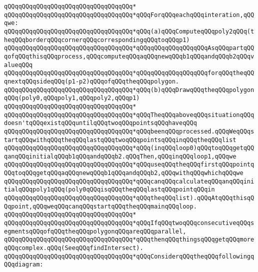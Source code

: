 \verb|qQQqqQQqqQQqqQQqqQQqqQQqqQQqqQQqqQQq*|\newline
\verb|qQQqqQQqqQQqqQQqqQQqqQQqqQQqqQQqqQQq*qQQqForqQQqeachqQQqinteration,qQQqwe:|\newline
\verb|qQQqqQQqqQQqqQQqqQQqqQQqqQQqqQQqqQQq*qQQq(a)qQQqComputeqQQqpoly2qQQq(theqQQqborderqQQqcornerqQQqcorrespondingqQQqtoqQQqp1)|\newline
\verb|qQQqqQQqqQQqqQQqqQQqqQQqqQQqqQQqqQQq*qQQqqQQqqQQqqQQqqQQqAsqQQqpartqQQqofqQQqthisqQQqprocess,qQQqcomputeqQQqaqQQqnewqQQqb1qQQqandqQQqb2qQQqvalueqQQq|\newline
\verb|qQQqqQQqqQQqqQQqqQQqqQQqqQQqqQQqqQQq*qQQqqQQqqQQqqQQqqQQqforqQQqtheqQQqnextqQQqsideqQQq(p1-p2)qQQqofqQQqtheqQQqpolygon.|\newline
\verb|qQQqqQQqqQQqqQQqqQQqqQQqqQQqqQQqqQQq*qQQq(b)qQQqDrawqQQqtheqQQqpolygonqQQq(poly0,qQQqpoly1,qQQqpoly2,qQQqp1)|\newline
\verb|qQQqqQQqqQQqqQQqqQQqqQQqqQQqqQQqqQQq*|\newline
\verb|qQQqqQQqqQQqqQQqqQQqqQQqqQQqqQQqqQQq*qQQqTheqQQqaboveqQQqsituationqQQqdoesn'tqQQqexistqQQquntilqQQqtwoqQQqpointsqQQqhaveqQQq|\newline
\verb|qQQqqQQqqQQqqQQqqQQqqQQqqQQqqQQqqQQq*qQQqbeenqQQqprocessed.qQQqWeqQQqstartqQQqwithqQQqtheqQQqlastqQQqtwoqQQqpointsqQQqinqQQqtheqQQqlist|\newline
\verb|qQQqqQQqqQQqqQQqqQQqqQQqqQQqqQQqqQQq*qQQq(inqQQqloop0)qQQqtoqQQqgetqQQqanqQQqinitialqQQqb1qQQqandqQQqb2.qQQqThen,qQQqinqQQqloop1,qQQqwe|\newline
\verb|qQQqqQQqqQQqqQQqqQQqqQQqqQQqqQQqqQQq*qQQquseqQQqtheqQQqfirstqQQqpointqQQqtoqQQqgetqQQqaqQQqnewqQQqb1qQQqandqQQqb2,qQQqwithqQQqwhichqQQqwe|\newline
\verb|qQQqqQQqqQQqqQQqqQQqqQQqqQQqqQQqqQQq*qQQqcanqQQqcalculateqQQqanqQQqinitialqQQqpoly1qQQq(poly0qQQqisqQQqtheqQQqlastqQQqpointqQQqin|\newline
\verb|qQQqqQQqqQQqqQQqqQQqqQQqqQQqqQQqqQQq*qQQqtheqQQqlist).qQQqAtqQQqthisqQQqpoint,qQQqweqQQqcanqQQqstartqQQqtheqQQqmainqQQqloop.|\newline
\verb|qQQqqQQqqQQqqQQqqQQqqQQqqQQqqQQqqQQq*|\newline
\verb|qQQqqQQqqQQqqQQqqQQqqQQqqQQqqQQqqQQq*qQQqIfqQQqtwoqQQqconsecutiveqQQqsegmentsqQQqofqQQqtheqQQqpolygonqQQqareqQQqparallel,|\newline
\verb|qQQqqQQqqQQqqQQqqQQqqQQqqQQqqQQqqQQq*qQQqthenqQQqthingsqQQqgetqQQqmoreqQQqcomplex.qQQq(SeeqQQqfindIntersect).|\newline
\verb|qQQqqQQqqQQqqQQqqQQqqQQqqQQqqQQqqQQq*qQQqConsiderqQQqtheqQQqfollowingqQQqdiagram:|\newline
